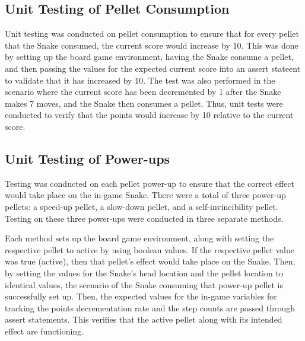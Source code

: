 \documentclass[12pt, titlepage]{article}
\begin{document}
\subsection{Unit Testing of Pellet Consumption}
Unit testing was conducted on pellet consumption to ensure that for every pellet that the Snake consumed, the current score would increase by 10. This was done by setting up the board game environment, having the Snake consume a pellet, and then passing the values for the expected current score into an assert stateent to validate that it has increased by 10. The test was also performed in the scenario where the current score has been decremented by 1 after the Snake makes 7 moves, and the Snake then consumes a pellet. Thus, unit tests were conducted to verify that the points would increase by 10 relative to the current score. 

\subsection{Unit Testing of Power-ups}
Testing was conducted on each pellet power-up to ensure that the correct effect would take place on the in-game Snake. There were a total of three power-up pellets: a speed-up pellet, a slow-down pellet, and a self-invincibility pellet. Testing on these three power-ups were conducted in three separate methods. 

Each method sets up the board game environment, along with setting the respective pellet to active by using boolean values. If the respective pellet value was true (active), then that pellet's effect would take place on the Snake. Then, by setting the values for the Snake's head location and the pellet location to identical values, the scenario of the Snake consuming that power-up pellet is successfully set up. Then, the expected values for the in-game variables for tracking the points decrementation rate and the step counts are passed through assert statements. This verifies that the active pellet along with its intended effect are functioning.  
\end{document}
